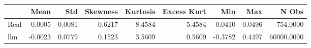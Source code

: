\begin{tabular}{lrrrrrrrr}
\toprule
 & Mean & Std & Skewness & Kurtosis & Excess Kurt & Min & Max & N Obs \\
\midrule
Real & 0.0005 & 0.0081 & -0.6217 & 8.4584 & 5.4584 & -0.0410 & 0.0496 & 754.0000 \\
llm & -0.0023 & 0.0779 & 0.1523 & 3.5609 & 0.5609 & -0.3782 & 0.4497 & 60000.0000 \\
\bottomrule
\end{tabular}
